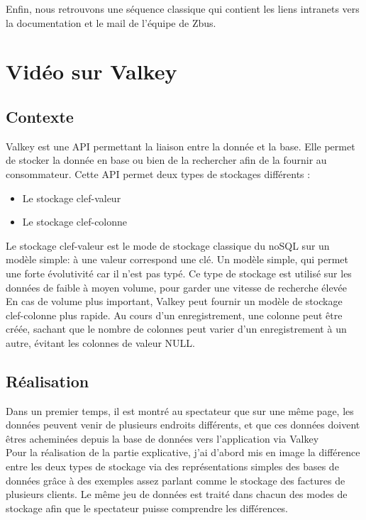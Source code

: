 Enfin, nous retrouvons une séquence classique qui contient les liens intranets vers la documentation et le mail de l'équipe de Zbus.


\section{Vidéo sur Valkey}

\subsection{Contexte}
Valkey est une API permettant la liaison entre la donnée et la base. Elle permet de stocker la donnée en base ou bien de la rechercher afin de la fournir au consommateur. Cette API permet deux types de stockages différents :\\
\begin{itemize}
\item Le stockage clef-valeur
\item Le stockage clef-colonne\\
\end{itemize}

Le stockage clef-valeur est le mode  de stockage classique du noSQL sur un modèle simple: à une valeur correspond une clé. Un modèle simple, qui permet une forte évolutivité car il n'est pas typé. Ce type de stockage est utilisé sur les données de faible à moyen volume, pour garder une vitesse de recherche élevée\\

En cas de volume plus important, Valkey peut fournir un modèle de stockage clef-colonne plus rapide. Au cours d’un enregistrement, une colonne peut être créée, sachant que le nombre de colonnes peut varier d’un enregistrement à un autre, évitant les colonnes de valeur NULL.\\


\subsection{Réalisation}

Dans un premier temps, il est montré au spectateur que sur une même page, les données peuvent venir de plusieurs endroits différents, et que ces données doivent êtres acheminées depuis la base de données vers l'application via Valkey\\

Pour la réalisation de la partie explicative, j'ai d'abord mis en image la différence entre les deux types de stockage via des représentations simples des bases de données grâce à des exemples assez parlant comme le stockage des factures de plusieurs clients. Le même jeu de données est traité dans chacun des modes de stockage afin que le spectateur puisse comprendre les différences.\\

